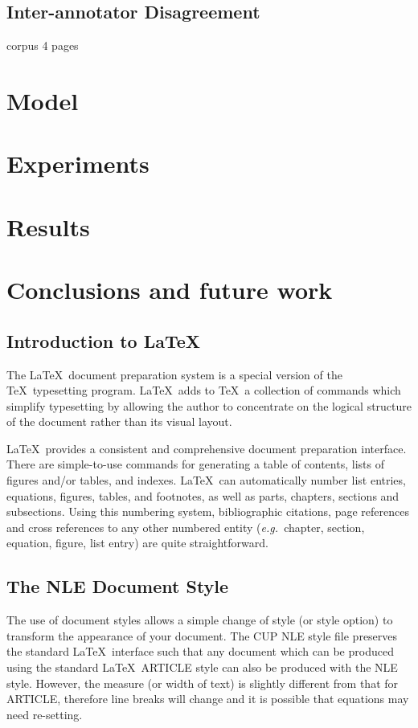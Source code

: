 \documentclass{nle}
\newcommand\eg{{\it e.g.\ }}
\begin{document}
\subsection{Inter-annotator Disagreement}
corpus 4 pages

\section{Model}

\section{Experiments}

\section{Results}

\section{Conclusions and future work}


\subsection{Introduction to \LaTeX}

The \LaTeX\ document preparation system is a special version of the
\TeX\ typesetting program. \LaTeX\ adds to \TeX\ a collection of
commands which simplify typesetting by allowing the author to
concentrate on the logical structure of the document rather than
its visual layout.

\LaTeX\ provides a consistent and comprehensive document preparation
interface. There are simple-to-use commands for generating a table of
contents, lists of figures and/or tables, and indexes. \LaTeX\ can
automatically number list entries, equations, figures, tables, and
footnotes, as well as parts, chapters, sections and subsections.
Using this numbering system, bibliographic citations, page references
and cross references to any other numbered entity (\eg chapter,
section, equation, figure, list entry) are quite straightforward.

\subsection{The NLE Document Style}

The use of document styles allows a simple change of style (or style option)
to transform the appearance of your document. The CUP NLE style file preserves
the standard \LaTeX\ interface such that any document which can be produced
using the standard \LaTeX\ ARTICLE style can also be produced with the
NLE style. However, the measure (or width of text) is slightly different
from that for ARTICLE, therefore line breaks will change and it is possible
that equations may need re-setting.
\end{document}
